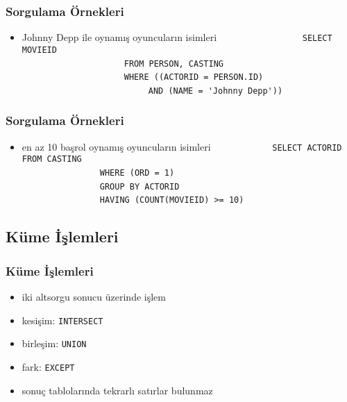 \documentclass[dvipsnames]{beamer}
\theoremstyle{plain}
\begin{document}
\begin{frame}[fragile]
  \frametitle{Sorgulama Örnekleri}

  \begin{itemize}
    \item Johnny Depp ile oynamış oyuncuların isimleri
     \medskip
{}
~~~~~~~~~~~~~~~~~\lstinline!SELECT MOVIEID!\\
~~~~~~~~~~~~~~~~~~~~~\lstinline!FROM PERSON, CASTING!\\
~~~~~~~~~~~~~~~~~~~~~\lstinline!WHERE ((ACTORID = PERSON.ID)!\\
~~~~~~~~~~~~~~~~~~~~~~~~~~\lstinline!AND (NAME = 'Johnny Depp'))!\\
  \end{itemize}
\end{frame}

\begin{frame}[fragile]
  \frametitle{Sorgulama Örnekleri}

  \begin{itemize}
    \item en az 10 başrol oynamış oyuncuların isimleri
    \medskip
{}
~~~~~~~~~~~~\lstinline!SELECT ACTORID FROM CASTING!\\
~~~~~~~~~~~~~~~~\lstinline!WHERE (ORD = 1)!\\
\pause
~~~~~~~~~~~~~~~~\lstinline!GROUP BY ACTORID!\\
\pause
~~~~~~~~~~~~~~~~\lstinline!HAVING (COUNT(MOVIEID) >= 10)!\\
  \end{itemize}
\end{frame}

\subsection{Küme İşlemleri}

\begin{frame}
  \frametitle{Küme İşlemleri}

  \begin{itemize}
    \item iki altsorgu sonucu üzerinde işlem

    \medskip
    \item kesişim: \lstinline!INTERSECT!
    \item birleşim: \lstinline!UNION!
    \item fark: \lstinline!EXCEPT!

    \medskip
    \item sonuç tablolarında tekrarlı satırlar bulunmaz
  \end{itemize}
\end{frame}
\end{document}
